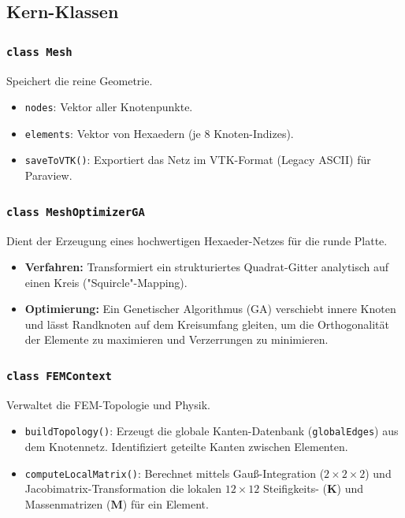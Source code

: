 \documentclass[a4paper,12pt]{article}
\begin{document}
\subsection{Kern-Klassen}

\subsubsection{\texttt{class Mesh}}
Speichert die reine Geometrie.
\begin{itemize}
    \item \texttt{nodes}: Vektor aller Knotenpunkte.
    \item \texttt{elements}: Vektor von Hexaedern (je 8 Knoten-Indizes).
    \item \texttt{saveToVTK()}: Exportiert das Netz im VTK-Format (Legacy ASCII) für Paraview.
\end{itemize}

\subsubsection{\texttt{class MeshOptimizerGA}}
Dient der Erzeugung eines hochwertigen Hexaeder-Netzes für die runde Platte.
\begin{itemize}
    \item \textbf{Verfahren:} Transformiert ein strukturiertes Quadrat-Gitter analytisch auf einen Kreis ("Squircle"-Mapping).
    \item \textbf{Optimierung:} Ein Genetischer Algorithmus (GA) verschiebt innere Knoten und lässt Randknoten auf dem Kreisumfang gleiten, um die Orthogonalität der Elemente zu maximieren und Verzerrungen zu minimieren.
\end{itemize}

\subsubsection{\texttt{class FEMContext}}
Verwaltet die FEM-Topologie und Physik.
\begin{itemize}
    \item \texttt{buildTopology()}: Erzeugt die globale Kanten-Datenbank (\texttt{globalEdges}) aus dem Knotennetz. Identifiziert geteilte Kanten zwischen Elementen.
    \item \texttt{computeLocalMatrix()}: Berechnet mittels Gauß-Integration ($2\times2\times2$) und Jacobimatrix-Transformation die lokalen $12\times12$ Steifigkeits- ($\mathbf{K}$) und Massenmatrizen ($\mathbf{M}$) für ein Element.
\end{itemize}
\end{document}
